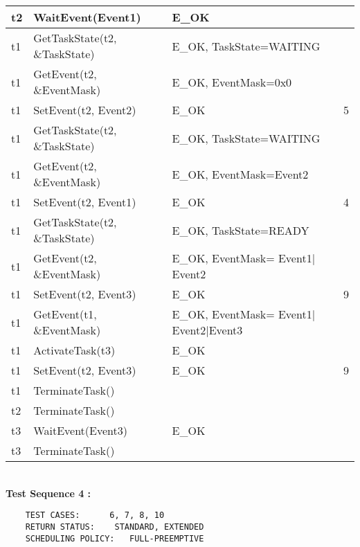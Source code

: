 \documentclass[10pt]{article}
\newlength{\Li}\settowidth{\Li}{Running}
\newlength{\Lii}\setlength{\Lii}{7cm}
\newlength{\Liiii}\setlength{\Liiii}{0.9cm}
\newlength{\Liii}\setlength{\Liii}{\textwidth} \addtolength{\Liii}{-\Li} \addtolength{\Liii}{-\Lii} \addtolength{\Liii}{-\Liiii}
\begin{document}
	\begin{supertabular}{|p{\Li}|p{\Lii}|p{\Liii}|p{\Liiii}|} \hline 
	t2 	& WaitEvent(Event1) 				& E\_OK 								&  \\ \hline
	t1	& GetTaskState(t2, \&TaskState) 		& E\_OK, TaskState=WAITING				& \\ \hline
	t1	& GetEvent(t2, \&EventMask) 			& E\_OK, EventMask=0x0					&  \\ \hline
	t1	& SetEvent(t2, Event2)				& E\_OK 								& 5  \\ \hline
	t1	& GetTaskState(t2, \&TaskState) 		& E\_OK, TaskState=WAITING				&   \\ \hline
	t1 	& GetEvent(t2, \&EventMask) 			& E\_OK, EventMask=Event2				&  \\ \hline
	t1	& SetEvent(t2, Event1)				& E\_OK								& 4  \\ \hline
	t1	& GetTaskState(t2, \&TaskState)		& E\_OK, TaskState=READY				&  \\ \hline
	t1 	& GetEvent(t2, \&EventMask) 			& E\_OK, EventMask= Event1$|$Event2		&  \\ \hline
	t1 	& SetEvent(t2, Event3)				& E\_OK 								& 9 \\ \hline
	t1	& GetEvent(t1, \&EventMask) 			& E\_OK, EventMask= Event1$|$Event2$|$Event3	&   \\ \hline
	t1 	& ActivateTask(t3)					& E\_OK 								& \\ \hline
	t1 	& SetEvent(t2, Event3)				& E\_OK 								& 9\\ \hline
	t1 	& TerminateTask()					&									& \\ \hline
	t2 	& TerminateTask()					&									& \\ \hline
	t3	& WaitEvent(Event3)					& E\_OK								& \\ \hline
	t3 	& TerminateTask()					&									& \\ \hline
	\end{supertabular} \\

	\textbf{Test Sequence 4 :}
	\begin{lstlisting}
	TEST CASES:		 6, 7, 8, 10
	RETURN STATUS:	  STANDARD, EXTENDED 
	SCHEDULING POLICY:   FULL-PREEMPTIVE
	\end{lstlisting}
	
	
\end{document}
